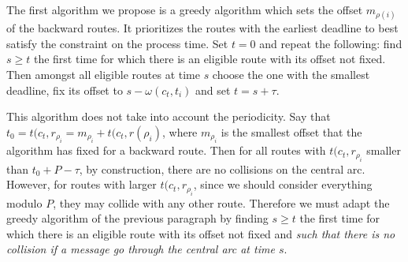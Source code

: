 \documentclass[10pt, conference, letterpaper]{IEEEtran}
\begin{document}
    The first algorithm we propose is a greedy algorithm which sets the offset $m_{\rho(i)}$ of the 
    backward routes. It prioritizes the routes with the earliest deadline to best satisfy the
    constraint on the process time.
    Set $t=0$ and repeat the following: find $s \geq t$ the first time for which there is an eligible route with its offset not fixed. Then amongst all eligible routes at time $s$ choose the one with the smallest deadline, fix its offset to $s - \omega(c_t,t_i) $ and set $t = s + \tau$.
    
    This algorithm does not take into account the periodicity. Say that $t_0 = t(c_t,r_{\rho_i} = m_{\rho_i} + t(c_t,r(\rho_i)$, where $m_{\rho_i}$ is the smallest offset that the algorithm has fixed
    for a backward route. Then for all routes with $t(c_t,r_{\rho_i}$ smaller than $t_0 + P - \tau$,
    by construction, there are no collisions on the central arc.
    However, for routes with larger $t(c_t,r_{\rho_i}$, since we  should consider everything modulo $P$, 
    they may collide with any other route. Therefore we must adapt the greedy algorithm of the previous paragraph by finding $s \geq t$ the first time for which there is an eligible route with its offset not fixed and \emph{such that there is no collision if a message go
    through the central arc at time $s$}. 
    
\end{document}
